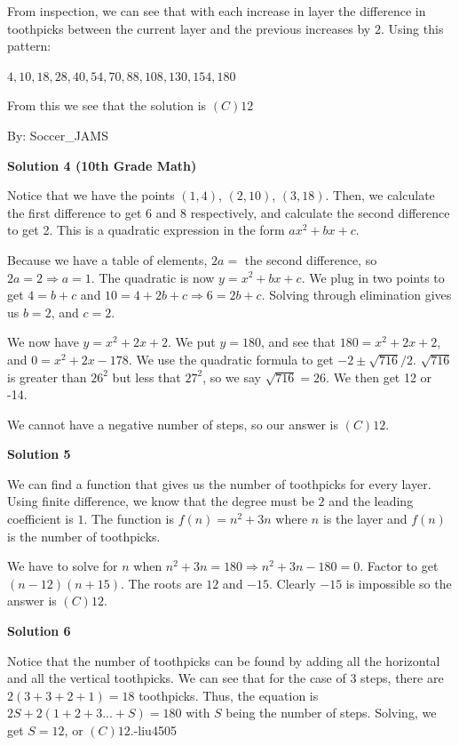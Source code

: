 \begin{enumerate}
 From inspection, we can see that with each increase in layer the difference in toothpicks between the current layer and the previous increases by $2$. Using this pattern:

 $4, 10, 18, 28, 40, 54, 70, 88, 108, 130, 154, 180$

 From this we see that the solution is $\boxed {(C) 12}$

 By: Soccer\_JAMS

 



\textbf{Solution 4 (10th Grade Math)}

Notice that we have the points \( (1,4) \), \( (2,10) \), \( (3,18) \). Then, we calculate the first difference to get 6 and 8 respectively, and calculate the second difference to get 2. This is a quadratic expression in the form \( ax^2 + bx + c \).

 Because we have a table of elements, \( 2a = \) the second difference, so \( 2a = 2 \Rightarrow a = 1 \). The quadratic is now \( y = x^2 + bx + c \). We plug in two points to get \( 4 = b + c \) and \( 10 = 4 + 2b + c \Rightarrow 6 = 2b + c \). Solving through elimination gives us \( b = 2 \), and \( c = 2 \).

 We now have \( y = x^2 + 2x + 2 \). We put \( y = 180 \), and see that \( 180 = x^2 + 2x + 2 \), and \( 0 = x^2 + 2x - 178 \). We use the quadratic formula to get \( -2 \pm \sqrt{716}/2 \). \( \sqrt{716} \) is greater than \( 26^2 \) but less that \( 27^2 \), so we say \( \sqrt{716} = 26 \). We then get 12 or -14.

 We cannot have a negative number of steps, so our answer is $\boxed {(C) 12}$.

 



\textbf{Solution 5}

We can find a function that gives us the number of toothpicks for every layer. Using finite difference, we know that the degree must be $2$ and the leading coefficient is $1$. The function is $f(n)=n^2+3n$ where $n$ is the layer and $f(n)$ is the number of toothpicks.

 
We have to solve for $n$ when $n^2+3n=180\Rightarrow n^2+3n-180=0$. Factor to get $(n-12)(n+15)$. The roots are $12$ and $-15$. Clearly $-15$ is impossible so the answer is $\boxed {(C) 12}$.

 



\textbf{Solution 6}

Notice that the number of toothpicks can be found by adding all the horizontal and all the vertical toothpicks. We can see that for the case of 3 steps, there are $2(3+3+2+1)=18$ toothpicks. Thus, the equation is $2S + 2(1+2+3...+S)=180$ with $S$ being the number of steps. Solving, we get $S = 12$, or $\boxed {(C) 12}$.-liu4505


\end{enumerate}
